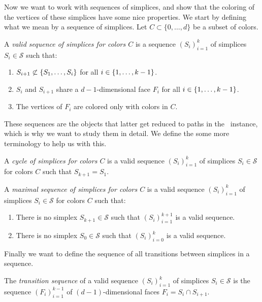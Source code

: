 Now we want to work with sequences of simplices, and show that the coloring of the vertices of these simplices have some nice properties. We start by defining what we mean by a sequence of simplices. Let $C \subset \{0, \dots, d\}$ be a subset of colors.
\begin{definition}
    A \emph{valid sequence of simplices for colors $C$} is a sequence $\left(S_i\right)_{i=1}^{k}$ of simplices $S_i \in \mathcal{S}$ such that:
    \begin{enumerate}
        \item $S_{i+1} \not\subset \left\{S_1, \dots, S_i\right\}$ for all $i \in \left\{1, \dots, k-1\right\}$.
        \item $S_i$ and $S_{i+1}$ share a $d-1$-dimensional face $F_i$ for all $i \in \left\{1, \dots, k-1\right\}$.
        \item The vertices of $F_i$ are colored only with colors in $C$.
    \end{enumerate}
\end{definition}
These sequences are the objects that latter get reduced to paths in the \EndOfLine\ instance, which is why we want to study them in detail. We define the some more terminology to help us with this.
\begin{definition}[Cycle]
    A \emph{cycle of simplices for colors $C$} is a valid sequence $\left(S_i\right)_{i=1}^{k}$ of simplices $S_i \in \mathcal{S}$ for colors $C$ such that $S_{k+1} = S_1$.
\end{definition}
\begin{definition}
    A \emph{maximal sequence of simplices for colors $C$} is a valid sequence $\left(S_i\right)_{i=1}^{k}$ of simplices $S_i \in \mathcal{S}$ for colors $C$ such that:
    \begin{enumerate}
        \item There is no simplex $S_{k+1} \in \mathcal{S}$ such that $\left(S_i\right)_{i=1}^{k+1}$ is a valid sequence.
        \item There is no simplex $S_{0} \in \mathcal{S}$ such that $\left(S_i\right)_{i=0}^{k}$ is a valid sequence.
    \end{enumerate}
\end{definition}
Finally we want to define the sequence of all transitions between simplices in a sequence.
\begin{definition}
    The \emph{transition sequence} of a valid sequence $\left(S_i\right)_{i=1}^{k}$ of simplices $S_i \in \mathcal{S}$ is the sequence $\left(F_i\right)_{i=1}^{k-1}$ of $(d-1)$-dimensional faces $F_i = S_i \cap S_{i+1}$.
\end{definition}

